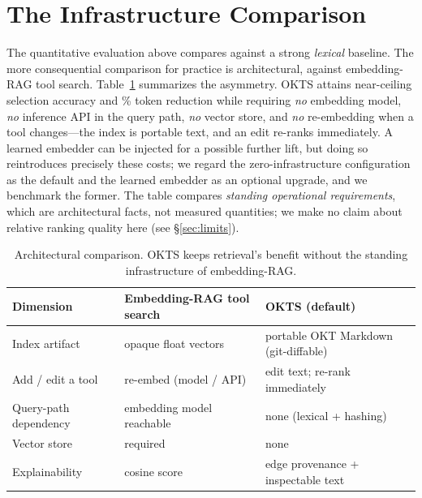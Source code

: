 \documentclass[11pt]{article}
\begin{document}
\section{The Infrastructure Comparison}
\label{sec:infra}

The quantitative evaluation above compares against a strong \emph{lexical}
baseline. The more consequential comparison for practice is architectural, against
embedding-RAG tool search. Table~\ref{tab:infra} summarizes the asymmetry. OKTS
attains near-ceiling selection accuracy and \reductionFull\% token reduction while
requiring \emph{no} embedding model, \emph{no} inference API in the query path,
\emph{no} vector store, and \emph{no} re-embedding when a tool changes---the index
is portable text, and an edit re-ranks immediately. A learned embedder can be
injected for a possible further lift, but doing so reintroduces precisely these
costs; we regard the zero-infrastructure configuration as the default and the
learned embedder as an optional upgrade, and we benchmark the former. The table
compares \emph{standing operational requirements}, which are architectural facts,
not measured quantities; we make no claim about relative ranking quality here
(see \S\ref{sec:limits}).

\begin{table}[h]
\centering
\caption{Architectural comparison. OKTS keeps retrieval's benefit without the
standing infrastructure of embedding-RAG.}
\label{tab:infra}
\small
\begin{tabular}{lll}
\toprule
Dimension & Embedding-RAG tool search & OKTS (default) \\
\midrule
Index artifact        & opaque float vectors      & portable OKT Markdown (git-diffable) \\
Add / edit a tool     & re-embed (model / API)    & edit text; re-rank immediately \\
Query-path dependency & embedding model reachable & none (lexical + hashing) \\
Vector store          & required                  & none \\
Explainability        & cosine score              & edge provenance + inspectable text \\
\bottomrule
\end{tabular}
\end{table}
\end{document}
